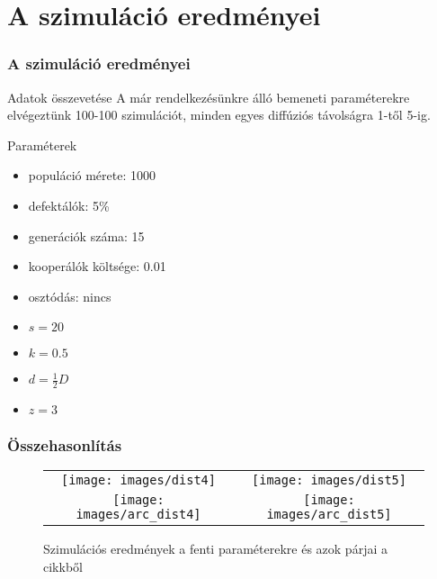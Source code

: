 \section{A szimuláció eredményei}
\begin{frame}
	\frametitle{A szimuláció eredményei}
	\begin{block}{Adatok összevetése}
		A már rendelkezésünkre álló bemeneti paraméterekre\cite{archetti2016cooperation} elvégeztünk 100-100 szimulációt, minden egyes diffúziós távolságra 1-től 5-ig.
	\end{block}

	\begin{block}{Paraméterek}
		\begin{multicols}{2}
			\begin{itemize}
				\item populáció mérete: 1000
				\item defektálók: 5\%
				\item generációk száma: 15
				\item kooperálók költsége: 0.01
				\item osztódás: nincs
			\end{itemize}
			\begin{itemize}
				\item $s = 20$
				\item $k = 0.5$
				\item $d = \frac{1}{2}D$
				\item $z = 3$
			\end{itemize}	
		\end{multicols}
	\end{block}
\end{frame}

\begin{frame}
	\frametitle{Összehasonlítás}
	\begin{figure}[h]
		\centering
		\begin{tabular}{cc}
			\texttt{[image: images/dist4]}
			&
			\texttt{[image: images/dist5]}
			\\
			\texttt{[image: images/arc\_dist4]}
			&
			\texttt{[image: images/arc\_dist5]}
			\\
		\end{tabular}
		\caption{Szimulációs eredmények a fenti paraméterekre és azok párjai a \cite{archetti2016cooperation} cikkből}
		\label{fig:DistChange}
	\end{figure}
\end{frame}

